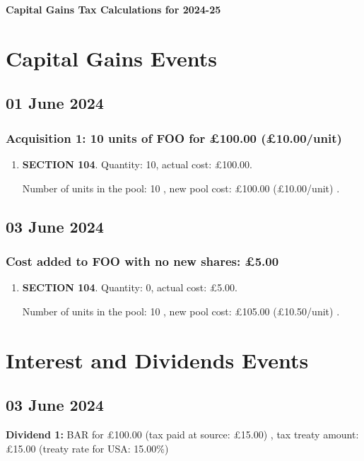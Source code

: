 \documentclass{article}
\begin{document}
\centerline{\Large\bfseries Capital Gains Tax Calculations for 2024-25}

\section*{Capital Gains Events}


\subsection*{01 June 2024}
\subsubsection*{
    Acquisition 1: 10 units of FOO for £100.00
    (£10.00/unit)%
}

\begin{enumerate}
\item \textbf{SECTION 104}. Quantity: 10,
    actual cost: £100.00.

    Number of units in the pool:
    10%
,
    new pool cost: £100.00
    (£10.00/unit)%
.

\end{enumerate}



\subsection*{03 June 2024}
\subsubsection*{Cost added to FOO with no new shares: £5.00}

\begin{enumerate}
\item \textbf{SECTION 104}. Quantity: 0,
    actual cost: £5.00.

    Number of units in the pool:
    10%
,
    new pool cost: £105.00
    (£10.50/unit)%
.

\end{enumerate}



\clearpage
\section*{Interest and Dividends Events}


\subsection*{03 June 2024}
\textbf{Dividend 1:} BAR for £100.00
(tax paid at source: £15.00)
, tax treaty amount: £15.00 (treaty rate for USA: 15.00\%)
\end{document}
